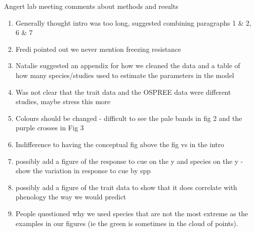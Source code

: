 \documentclass{article}
\begin{document}
Angert lab meeting comments about methods and results
\begin{enumerate}
\item Generally thought intro was too long, suggested combining paragraphs 1 \& 2, 6 \& 7 %
\item Fredi pointed out we never mention freezing resistance %
\item Natalie suggested an appendix for how we cleaned the data and a table of how many species/studies used to estimate the parameters in the model %
\item Was not clear that the trait data and the OSPREE data were different studies, maybe stress this more %
\item Colours should be changed - difficult to see the pale bands in fig 2 and the purple crosses in Fig 3
\item Indifference to having the conceptual fig above the fig vs in the intro 
\item possibly add a figure of the response to cue on the y and species on the y - show the variation in response to cue by spp %
\item possibly add a figure of the trait data to show that it does correlate with phenology the way we would predict %
\item People questioned why we used species that are not the most extreme as the examples in our figures (ie the green is sometimes in the cloud of points). %
\end{enumerate}

\end{document}
